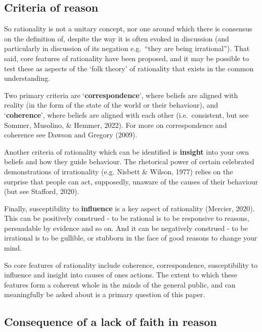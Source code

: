 \documentclass[
  ,jou,floatsintext]{apa6}
\begin{document}
\hypertarget{criteria-of-reason}{%
\subsection{Criteria of reason}\label{criteria-of-reason}}

So rationality is not a unitary concept, nor one around which there is consensus on the definition of, despite the way it is often evoked in discussion (and particularly in discussion of its negation e.g.~``they are being irrational''). That said, core features of rationality have been proposed, and it may be possible to test these as aspects of the `folk theory' of rationality that exists in the common understanding.

Two primary criteria are `\textbf{correspondence}', where beliefs are aligned with reality (in the form of the state of the world or their behaviour), and `\textbf{coherence}', where beliefs are aligned with each other (i.e.~consistent, but see Sommer, Musolino, \& Hemmer, 2022). For more on correspondence and coherence see Dawson and Gregory (2009).

Another criteria of rationality which can be identified is \textbf{insight} into your own beliefs and how they guide behaviour. The rhetorical power of certain celebrated demonstrations of irrationality (e.g. Nisbett \& Wilson, 1977) relies on the surprise that people can act, supposedly, unaware of the causes of their behaviour (but see Stafford, 2020).

Finally, susceptibility to \textbf{influence} is a key aspect of rationality (Mercier, 2020). This can be positively construed - to be rational is to be responsive to reasons, persuadable by evidence and so on. And it can be negatively construed - to be irrational is to be gullible, or stubborn in the face of good reasons to change your mind.

So core features of rationality include coherence, correspondence, susceptibility to influence and insight into causes of ones actions. The extent to which these features form a coherent whole in the minds of the general public, and can meaningfully be asked about is a primary question of this paper.

\hypertarget{consequence-of-a-lack-of-faith-in-reason}{%
\subsection{Consequence of a lack of faith in reason}\label{consequence-of-a-lack-of-faith-in-reason}}
\end{document}
